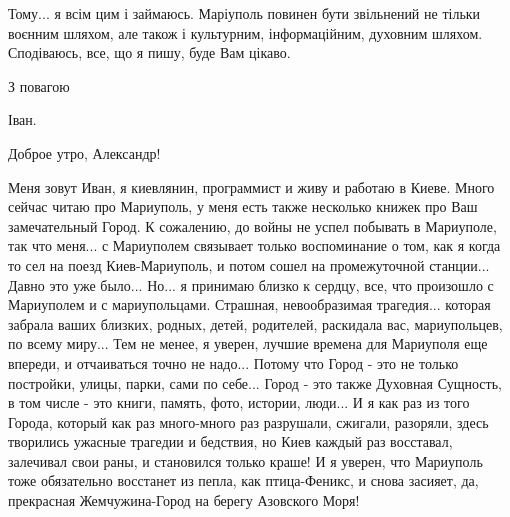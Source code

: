 Тому... я всім цим і займаюсь. Маріуполь повинен бути звільнений не тільки
воєнним шляхом, але також і культурним, інформаційним, духовним шляхом.
Сподіваюсь, все, що я пишу, буде Вам цікаво. 


З повагою

Іван.


Доброе утро, Александр! 

Меня зовут Иван, я киевлянин, программист и живу и работаю в Киеве. Много
сейчас читаю про Мариуполь, у меня есть также несколько книжек про Ваш
замечательный Город. К сожалению, до войны не успел побывать в Мариуполе, так
что меня... с Мариуполем связывает только воспоминание о том, как я когда то
сел на поезд Киев-Мариуполь, и потом сошел на промежуточной станции... Давно
это уже было... Но... я принимаю близко к сердцу, все, что произошло с
Мариуполем и с мариупольцами. Страшная, невообразимая трагедия...  которая
забрала ваших близких, родных, детей, родителей, раскидала вас, мариупольцев,
по всему миру... Тем не менее, я уверен, лучшие времена для Мариуполя еще
впереди, и отчаиваться точно не надо... Потому что Город - это не только
постройки, улицы, парки, сами по себе... Город - это также Духовная Сущность, в
том числе - это книги, память, фото, истории, люди...  И я как раз из того Города,
который как раз много-много раз разрушали, сжигали, разоряли, здесь творились
ужасные трагедии и бедствия, но Киев каждый раз восставал, залечивал свои раны,
и становился только краше! И я уверен, что Мариуполь тоже обязательно
восстанет из пепла, как птица-Феникс, и снова засияет, да, прекрасная
Жемчужина-Город на берегу Азовского Моря!

